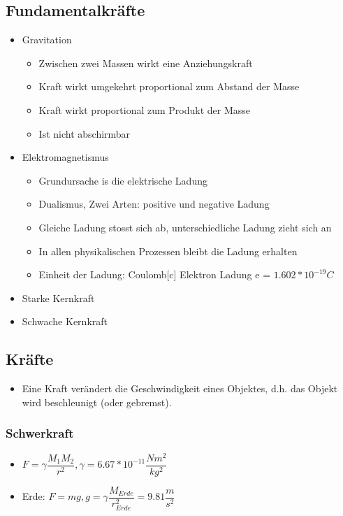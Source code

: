 \documentclass[6pt,a4paper]{scrartcl}
\begin{document}
\begin{multicols*}{4}
    		\subsection{Fundamentalkräfte}
			\begin{itemize}\itemsep0pt				
				\item Gravitation
				\begin{itemize}\itemsep0pt				
					\item Zwischen zwei Massen wirkt eine Anziehungskraft
					\item Kraft wirkt umgekehrt proportional zum Abstand der Masse
					\item Kraft wirkt proportional zum Produkt der Masse
					\item Ist nicht abschirmbar
				\end{itemize}
				\item Elektromagnetismus				
				\begin{itemize}\itemsep0pt				
					\item Grundursache is die elektrische Ladung
					\item Dualismus, Zwei Arten: positive und negative Ladung
					\item Gleiche Ladung stosst sich ab, unterschiedliche Ladung zieht sich an
					\item In allen physikalischen Prozessen bleibt die Ladung erhalten
					\item Einheit der Ladung: Coulomb[c] Elektron Ladung e = $1.602*10^{-19}C$
				\end{itemize}
				\item Starke Kernkraft		
				\item Schwache Kernkraft
			\end{itemize}
			
			\subsection{Kräfte}
				\begin{itemize}\itemsep0pt					
					\item Eine Kraft verändert die Geschwindigkeit eines Objektes, d.h. das Objekt wird beschleunigt (oder gebremst). 
				\end{itemize}
				\subsubsection{Schwerkraft}
					\begin{itemize}\itemsep0pt				
						\item $F=\gamma\dfrac{M_{1}M_{2}}{r^{2}}, \gamma = 6.67*10^{-11}\dfrac{Nm^{2}}{kg^{2}}$
						\item Erde: $F =mg, g = \gamma\dfrac{M_{Erde}}{r_{Erde}^{2}}=9.81\dfrac{m}{s^{2}}$
					\end{itemize}

\end{multicols*}
\end{document}
